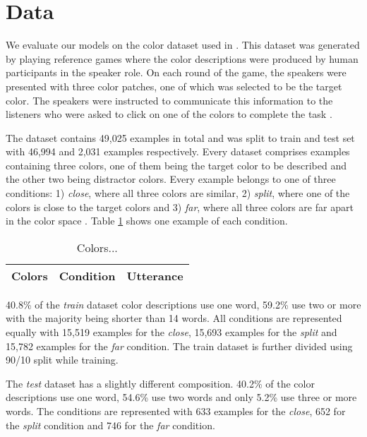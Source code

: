 \section{Data}

We evaluate our models on the color dataset used in \citep{monroe-2017-colors}. This dataset was generated by playing reference games where the color descriptions were produced by human participants in the speaker role. On each round of the game, the speakers were presented with three color patches, one of which was selected to be the target color. The speakers were instructed to communicate this information to the listeners who were asked to click on one of the colors to complete the task \citep{monroe-2017-colors}.

\par
The dataset contains 49,025 examples in total and was split to train and test set with 46,994 and 2,031 examples respectively. Every dataset comprises examples containing three colors, one of them being the target color to be described and the other two being distractor colors. Every example belongs to one of three conditions: 1) \emph{close}, where all three colors are similar, 2) \emph{split}, where one of the colors is close to the target colors and 3) \emph{far}, where all three colors are far apart in the color space \citep{monroe-2017-colors}. Table \ref{table:colors} shows one example of each condition.

\begin{table}[ht]
\centering
\renewcommand{\arraystretch}{1}
\begin{tabular}{|l|l|l|}

  \hline
  Colors & Condition & Utterance \\
  \hline

\end{tabular}
\caption[Colors]{Colors...}
\label{table:colors}
\end{table}

\par
40.8\% of the \emph{train} dataset color descriptions use one word, 59.2\% use two or more with the majority being shorter than 14 words. All conditions are represented equally with 15,519 examples for the \emph{close}, 15,693 examples for the \emph{split} and 15,782 examples for the \emph{far} condition. The train dataset is further divided using 90/10 split while training.

\par
The \emph{test} dataset has a slightly different composition. 40.2\% of the color descriptions use one word, 54.6\% use two words and only 5.2\% use three or more words. The conditions are represented with 633 examples for the \emph{close}, 652 for the \emph{split} condition and 746 for the \emph{far} condition.